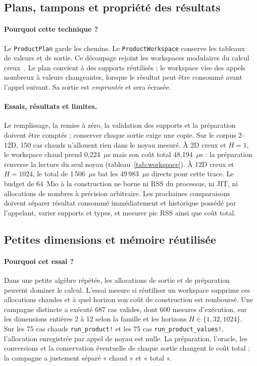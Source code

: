 \documentclass[11pt,a4paper]{article}
\newcommand{\code}[1]{\texttt{#1}}
\begin{document}
\subsection{Plans, tampons et propriété des résultats}
\paragraph{Pourquoi cette technique ?}
Le \code{ProductPlan} garde les chemins. Le \code{ProductWorkspace} conserve
les tableaux de valeurs et de sortie. Ce découpage
rejoint les workspaces modulaires du calcul creux~\cite{sparseworkspace}.
Le plan convient à des supports réutilisés ; le workspace vise des appels
nombreux à valeurs changeantes, lorsque le résultat peut être consommé avant
l'appel suivant. Sa sortie est \emph{empruntée} et sera écrasée.
\paragraph{Essais, résultats et limites.}
Le remplissage, la remise à zéro, la validation des supports et la préparation
doivent être comptés ; conserver chaque sortie exige une copie. Sur le corpus
2--12D, 150 cas chauds n'allouent rien dans le noyau mesuré. À 2D creux
et $H=1$, le workspace chaud prend 0,224~\(\mu\)s mais son coût total
48,194~\(\mu\)s : la préparation renverse la lecture du seul noyau
(tableau~\ref{tab:workspace}). À 12D creux et $H=1024$, le total de
1\,506~\(\mu\)s bat les 49\,983~\(\mu\)s directs pour cette trace.
Le budget de 64~Mio à la construction ne borne ni RSS du processus, ni JIT,
ni allocations de nombres à précision arbitraire. Les prochaines comparaisons
doivent séparer résultat consommé immédiatement et historique possédé par
l'appelant, varier supports et types, et mesurer pic RSS ainsi que coût total.

\subsection{Petites dimensions et mémoire réutilisée}
\paragraph{Pourquoi cet essai ?}
Dans une petite algèbre répétée, les allocations de sortie et de
préparation peuvent dominer le calcul. L'essai mesure si réutiliser un
workspace supprime ces allocations chaudes et à quel horizon son
coût de construction est remboursé.
Une campagne distincte a exécuté 687 cas valides, dont 600 mesures d'exécution,
sur les dimensions entières 2 à 12 selon la famille et les horizons
$H\in\{1,32,1024\}$. Sur les 75 cas chauds \code{run\_product!} et les 75 cas
\code{run\_product\_values!}, l'allocation enregistrée par appel de noyau est
nulle. La préparation, l'oracle, les conversions et la conservation éventuelle
de chaque sortie changent le coût total ; la campagne a justement séparé
« chaud » et « total ».
\end{document}
